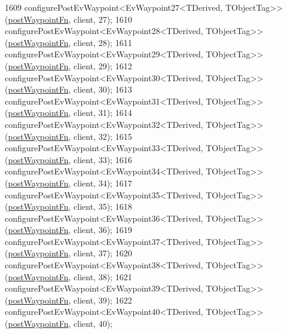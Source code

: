 \begin{DoxyCode}
1609     configurePostEvWaypoint<EvWaypoint27<TDerived, TObjectTag>>(\hyperlink{classmove__base__z__client_1_1WaypointEventDispatcher_acc538eb7506c13f7cca2268a1742dadd}{postWaypointFn}, client, 27);
1610     configurePostEvWaypoint<EvWaypoint28<TDerived, TObjectTag>>(\hyperlink{classmove__base__z__client_1_1WaypointEventDispatcher_acc538eb7506c13f7cca2268a1742dadd}{postWaypointFn}, client, 28);
1611     configurePostEvWaypoint<EvWaypoint29<TDerived, TObjectTag>>(\hyperlink{classmove__base__z__client_1_1WaypointEventDispatcher_acc538eb7506c13f7cca2268a1742dadd}{postWaypointFn}, client, 29);
1612     configurePostEvWaypoint<EvWaypoint30<TDerived, TObjectTag>>(\hyperlink{classmove__base__z__client_1_1WaypointEventDispatcher_acc538eb7506c13f7cca2268a1742dadd}{postWaypointFn}, client, 30);
1613     configurePostEvWaypoint<EvWaypoint31<TDerived, TObjectTag>>(\hyperlink{classmove__base__z__client_1_1WaypointEventDispatcher_acc538eb7506c13f7cca2268a1742dadd}{postWaypointFn}, client, 31);
1614     configurePostEvWaypoint<EvWaypoint32<TDerived, TObjectTag>>(\hyperlink{classmove__base__z__client_1_1WaypointEventDispatcher_acc538eb7506c13f7cca2268a1742dadd}{postWaypointFn}, client, 32);
1615     configurePostEvWaypoint<EvWaypoint33<TDerived, TObjectTag>>(\hyperlink{classmove__base__z__client_1_1WaypointEventDispatcher_acc538eb7506c13f7cca2268a1742dadd}{postWaypointFn}, client, 33);
1616     configurePostEvWaypoint<EvWaypoint34<TDerived, TObjectTag>>(\hyperlink{classmove__base__z__client_1_1WaypointEventDispatcher_acc538eb7506c13f7cca2268a1742dadd}{postWaypointFn}, client, 34);
1617     configurePostEvWaypoint<EvWaypoint35<TDerived, TObjectTag>>(\hyperlink{classmove__base__z__client_1_1WaypointEventDispatcher_acc538eb7506c13f7cca2268a1742dadd}{postWaypointFn}, client, 35);
1618     configurePostEvWaypoint<EvWaypoint36<TDerived, TObjectTag>>(\hyperlink{classmove__base__z__client_1_1WaypointEventDispatcher_acc538eb7506c13f7cca2268a1742dadd}{postWaypointFn}, client, 36);
1619     configurePostEvWaypoint<EvWaypoint37<TDerived, TObjectTag>>(\hyperlink{classmove__base__z__client_1_1WaypointEventDispatcher_acc538eb7506c13f7cca2268a1742dadd}{postWaypointFn}, client, 37);
1620     configurePostEvWaypoint<EvWaypoint38<TDerived, TObjectTag>>(\hyperlink{classmove__base__z__client_1_1WaypointEventDispatcher_acc538eb7506c13f7cca2268a1742dadd}{postWaypointFn}, client, 38);
1621     configurePostEvWaypoint<EvWaypoint39<TDerived, TObjectTag>>(\hyperlink{classmove__base__z__client_1_1WaypointEventDispatcher_acc538eb7506c13f7cca2268a1742dadd}{postWaypointFn}, client, 39);
1622     configurePostEvWaypoint<EvWaypoint40<TDerived, TObjectTag>>(\hyperlink{classmove__base__z__client_1_1WaypointEventDispatcher_acc538eb7506c13f7cca2268a1742dadd}{postWaypointFn}, client, 40);

\end{DoxyCode}
